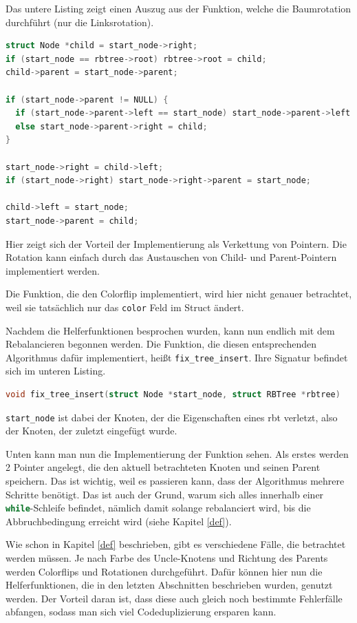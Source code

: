 \documentclass[11pt]{article}
\newcommand{\lstin}[1]{\lstinline[language=C]{#1}}
\begin{document}
Das untere Listing zeigt einen Auszug aus der Funktion, welche die Baumrotation durchführt (nur die Linksrotation).

\begin{lstlisting}[language=C]
struct Node *child = start_node->right;
if (start_node == rbtree->root) rbtree->root = child;
child->parent = start_node->parent;

if (start_node->parent != NULL) {
  if (start_node->parent->left == start_node) start_node->parent->left = child;
  else start_node->parent->right = child;
}

start_node->right = child->left;
if (start_node->right) start_node->right->parent = start_node;

child->left = start_node;
start_node->parent = child;
\end{lstlisting}

Hier zeigt sich der Vorteil der Implementierung als Verkettung von Pointern. Die Rotation kann einfach durch das Austauschen von Child- und Parent-Pointern implementiert werden.

Die Funktion, die den Colorflip implementiert, wird hier nicht genauer betrachtet, weil sie tatsächlich nur das \lstin{color} Feld im Struct ändert.

Nachdem die Helferfunktionen besprochen wurden, kann nun endlich mit dem Rebalancieren begonnen werden.
Die Funktion, die diesen entsprechenden Algorithmus dafür implementiert, heißt \lstin{fix_tree_insert}. Ihre Signatur befindet sich im unteren Listing.

\begin{lstlisting}[language=C]
void fix_tree_insert(struct Node *start_node, struct RBTree *rbtree)
\end{lstlisting}

\lstin{start_node} ist dabei der Knoten, der die Eigenschaften eines \gls{rbt} verletzt, also der Knoten, der zuletzt eingefügt wurde.

Unten kann man nun die Implementierung der Funktion sehen.
Als erstes werden 2 Pointer angelegt, die den aktuell betrachteten Knoten und seinen Parent speichern.
Das ist wichtig, weil es passieren kann, dass der Algorithmus mehrere Schritte benötigt.
Das ist auch der Grund, warum sich alles innerhalb einer \lstin{while}-Schleife befindet, nämlich damit solange rebalanciert wird,
bis die Abbruchbedingung erreicht wird (siehe Kapitel \ref{def}).

Wie schon in Kapitel \ref{def} beschrieben, gibt es verschiedene Fälle, die betrachtet werden müssen.
Je nach Farbe des Uncle-Knotens und Richtung des Parents werden Colorflips und Rotationen durchgeführt.
Dafür können hier nun die Helferfunktionen, die in den letzten Abschnitten beschrieben wurden, genutzt werden.
Der Vorteil daran ist, dass diese auch gleich noch bestimmte Fehlerfälle abfangen, sodass man sich viel Codeduplizierung ersparen kann.
\end{document}
